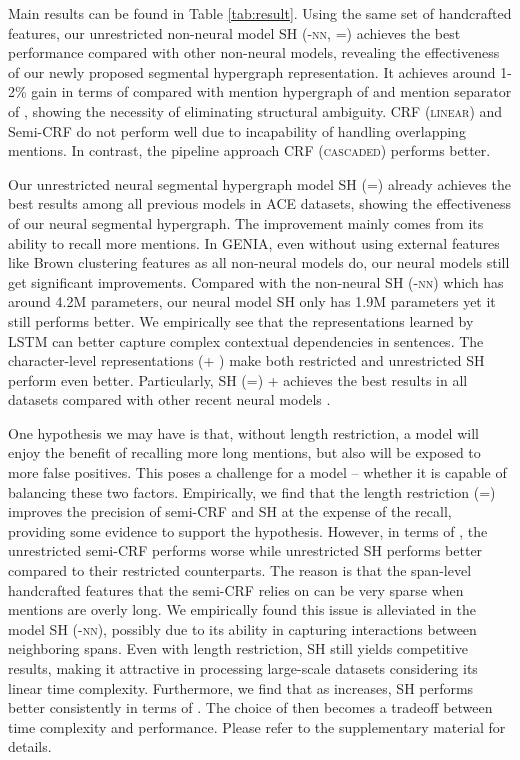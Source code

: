 \documentclass[11pt,a4paper]{article}
\theoremstyle{theorem}
\begin{document}
Main results can be found in Table \ref{tab:result}.
Using the same set of handcrafted features, our unrestricted non-neural model SH (-\textsc{nn}, =) achieves the best performance compared with other non-neural models, 
revealing the effectiveness of our newly proposed segmental hypergraph representation.
It achieves around 1-2\% gain in terms of  compared with mention hypergraph of \citet{lu2015joint} and mention separator of \citet{muis2017labeling}, 
showing the necessity of eliminating structural ambiguity.
CRF (\textsc{linear}) and Semi-CRF do not perform well due to incapability of handling overlapping mentions. 
In contrast, the pipeline approach CRF (\textsc{cascaded}) performs better.


Our unrestricted neural segmental hypergraph model SH (=) already achieves the best results among 
all previous models in ACE datasets, showing the effectiveness of our neural segmental hypergraph.
The improvement mainly comes from its ability to recall more mentions.
In GENIA, even without using external features like Brown clustering features as all non-neural models do, our neural models still get significant improvements. 
Compared with the non-neural SH (-\textsc{nn}) which has around 4.2M parameters, our neural model SH only has  1.9M parameters yet it still performs better.
We empirically see that the representations learned by LSTM can better capture complex contextual dependencies in sentences.
The character-level representations (+ ) make both restricted and unrestricted SH perform even better.
Particularly, SH (=) +  achieves the best results in all datasets 
compared with other recent neural models  \cite{N18-1079,N18-1131,nest-bw-em18}.


One hypothesis we may have is that, without length restriction, a model will enjoy the benefit of recalling more long mentions, but also will be exposed to more false positives.
This poses a challenge for a model -- whether it is capable of balancing these two factors. 
Empirically, we find that the length restriction (=) improves the precision of semi-CRF and SH at the expense of the recall, providing some evidence to support the hypothesis. 
However, in terms of , the unrestricted semi-CRF performs worse while unrestricted SH performs better compared to their restricted counterparts. 
The reason is that the span-level handcrafted features that the semi-CRF relies on can be very sparse when mentions are overly long.
We empirically found this issue is alleviated in the model SH (-\textsc{nn}), possibly due to its ability in capturing interactions between neighboring spans.
Even with length restriction, SH still yields competitive results, making it attractive in processing large-scale datasets considering its linear time complexity.
{\color{black}Furthermore, we find that as  increases, SH performs better consistently in terms of . 
The choice of  then becomes a tradeoff between time complexity and performance.
Please refer to the supplementary material for details.
}
\end{document}
